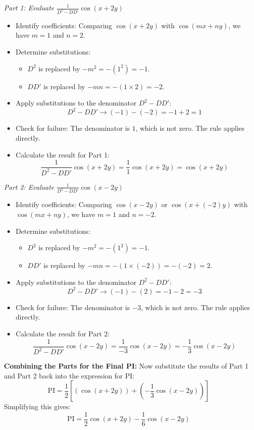 \documentclass{article}
\theoremstyle{remark}
\begin{document}
	\vspace{\baselineskip} %
	\textit{Part 1: Evaluate $\frac{1}{D^2 - DD'} \cos(x+2y)$}
	\begin{itemize}
		\item Identify coefficients: Comparing $\cos(x+2y)$ with $\cos(mx+ny)$, we have $m=1$ and $n=2$.
		\item Determine substitutions:
		\begin{itemize}
			\item $D^2$ is replaced by $-m^2 = -(1^2) = -1$.
			\item $DD'$ is replaced by $-mn = -(1 \times 2) = -2$.
		\end{itemize}
		\item Apply substitutions to the denominator $D^2 - DD'$:
		\[ D^2 - DD' \longrightarrow (-1) - (-2) = -1 + 2 = 1 \]
		\item Check for failure: The denominator is $1$, which is not zero. The rule applies directly.
		\item Calculate the result for Part 1:
		\[ \frac{1}{D^2 - DD'} \cos(x+2y) = \frac{1}{1} \cos(x+2y) = \cos(x+2y) \]
	\end{itemize}
	
	\vspace{\baselineskip} %
	\textit{Part 2: Evaluate $\frac{1}{D^2 - DD'} \cos(x-2y)$}
	\begin{itemize}
		\item Identify coefficients: Comparing $\cos(x-2y)$ or $\cos(x+(-2)y)$ with $\cos(mx+ny)$, we have $m=1$ and $n=-2$.
		\item Determine substitutions:
		\begin{itemize}
			\item $D^2$ is replaced by $-m^2 = -(1^2) = -1$.
			\item $DD'$ is replaced by $-mn = -(1 \times (-2)) = -(-2) = 2$.
		\end{itemize}
		\item Apply substitutions to the denominator $D^2 - DD'$:
		\[ D^2 - DD' \longrightarrow (-1) - (2) = -1 - 2 = -3 \]
		\item Check for failure: The denominator is $-3$, which is not zero. The rule applies directly.
		\item Calculate the result for Part 2:
		\[ \frac{1}{D^2 - DD'} \cos(x-2y) = \frac{1}{-3} \cos(x-2y) = -\frac{1}{3}\cos(x-2y) \]
	\end{itemize}
	
	\vspace{\baselineskip} %
	\textbf{Combining the Parts for the Final PI:}
	Now substitute the results of Part 1 and Part 2 back into the expression for PI:
	\[
	\text{PI} = \frac{1}{2} \left[ (\cos(x+2y)) + \left(-\frac{1}{3}\cos(x-2y)\right) \right]
	\]
	Simplifying this gives:
	\[
	\boxed{\text{PI} = \frac{1}{2}\cos(x+2y) - \frac{1}{6}\cos(x-2y)}
	\]
	
\end{document}
